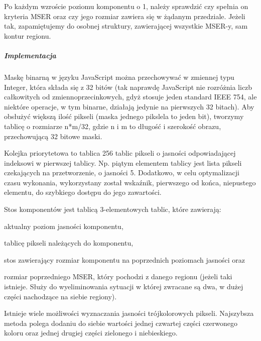 Po każdym wzroście poziomu komponentu o 1, należy sprawdzić czy spełnia on
kryteria MSER oraz czy jego rozmiar zawiera się w żądanym przedziale. Jeżeli
tak, zapamiętujemy do osobnej struktury, zawierającej wszystkie MSER-y, sam
kontur regionu.

\subparagraph{Implementacja}

Maskę binarną w języku JavaScript można przechowywać w zmiennej typu Integer,
która składa się z 32 bitów (tak naprawdę JavaScript nie rozróżnia liczb
całkowitych od zmiennoprzecinkowych, gdyż stosuje jeden standard IEEE 754, ale
niektóre operacje, w tym binarne, działają jedynie na pierwszych 32 bitach).
Aby obsłużyć większą ilość pikseli (maska jednego pikslela to jeden bit),
tworzymy tablicę o rozmiarze n*m/32, gdzie n i m to długość i szerokość obrazu,
przechowującą 32 bitowe maski.

Kolejka priorytetowa to tablica 256 tablic pikseli o jasności odpowiadającej
indeksowi w pierwszej tablicy. Np. piątym elementem tablicy jest lista pikseli
czekających na przetworzenie, o jasności 5. Dodatkowo, w celu optymalizacji
czasu wykonania, wykorzystany został wskaźnik, pierwszego od końca, niepustego
elementu, do szybkiego dostępu do jego zawartości.

Stos komponentów jest tablicą 3-elementowych tablic, które zawierają:
\begin{inparaenum} \item aktualny poziom jasności
  komponentu, \item tablicę pikseli należących do komponentu, \item stos
  zawierający rozmiar komponentu na poprzednich poziomach jasności oraz \item
  rozmiar poprzedniego MSER, który pochodzi z danego regionu (jeżeli taki
  istnieje. Służy do wyeliminowania sytuacji w której zwracane są dwa, w dużej
  części nachodzące na siebie regiony).  \end{inparaenum}

Istnieje wiele możliwości wyznaczania jasności trójkolorowych pikseli.
Najszybsza metoda polega dodaniu do siebie wartości jednej czwartej części
czerwonego koloru oraz jednej drugiej części zielonego i niebieskiego.
